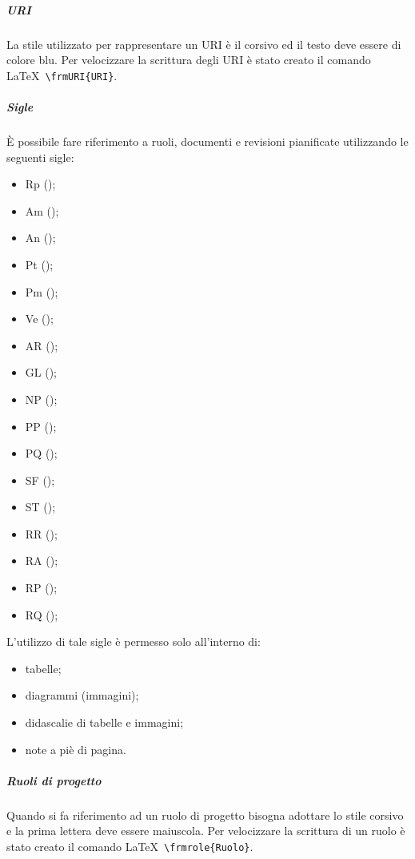 \documentclass[../NormeProgetto.tex]{subfiles}
\begin{document}
			\subparagraph{URI}
				La stile utilizzato per rappresentare un URI è il corsivo ed il testo deve essere di colore blu. Per velocizzare la scrittura degli URI è stato creato il comando \LaTeX\ \texttt{\textbackslash frmURI\{URI\}}.
			 
			\subparagraph{Sigle}
				È possibile fare riferimento a ruoli, documenti e revisioni pianificate utilizzando le seguenti sigle:
				\begin{itemize}
					\item Rp (\responsabilediprogetto);
					\item Am (\amministratore);
					\item An (\analista);
					\item Pt (\progettista);
					\item Pm (\programmatore);
					\item Ve (\verificatore);
					
					\item AR (\analisideirequisiti);
					\item GL (\glossario);
					\item NP (\normediprogetto);
					\item PP (\pianodiprogetto);
					\item PQ (\pianodiqualifica);
					\item SF (\studiodifattibilita);
					\item ST (\specificatecnica);
					
					\item RR (\revisionedeirequisiti);
					\item RA (\revisionediaccettazione);
					\item RP (\revisionediprogettazione);
					\item RQ (\revisionediqualifica);
				\end{itemize}
				L'utilizzo di tale sigle è permesso solo all'interno di:
				\begin{itemize}
					\item tabelle;
					\item diagrammi (immagini);
					\item didascalie di tabelle e immagini;
					\item note a piè di pagina.
				\end{itemize}
			\subparagraph{Ruoli di progetto}
				Quando si fa riferimento ad un ruolo di progetto bisogna adottare lo stile corsivo e la prima lettera deve essere maiuscola. 	 Per velocizzare la scrittura di un ruolo è stato creato il comando \LaTeX\ \texttt{\textbackslash frmrole\{Ruolo\}}. 
			
\end{document}
